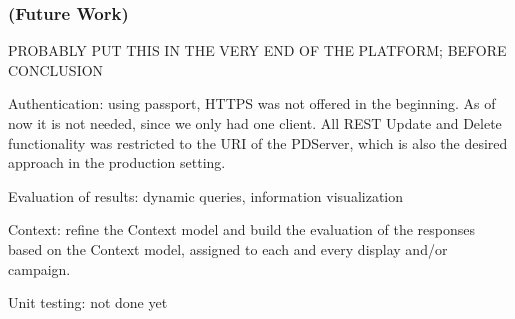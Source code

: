 	\subsubsection{(Future Work)}

		PROBABLY PUT THIS IN THE VERY END OF THE PLATFORM; BEFORE CONCLUSION


		Authentication: using passport, HTTPS was not offered in the beginning. As of now it is not needed, since we only had one client. All REST Update and Delete functionality was restricted to the URI of the PDServer, which is also the desired approach in the production setting.

		Evaluation of results: dynamic queries, information visualization

		Context: refine the Context model and build the evaluation of the responses based on the Context model, assigned to each and every display and/or campaign.

		Unit testing: not done yet

